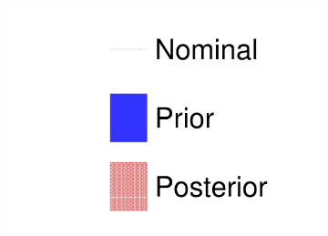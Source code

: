 \begin{figure}[h]
\begin{subfigure}[t]{0.32\textwidth}
	\end{subfigure}
	\begin{subfigure}[t]{0.32\textwidth}
		\includegraphics[width=\textwidth, trim={0mm 0mm 0mm 0mm}, clip, page=6]{figures/mach3/data/prior_error_1june_try_2017_fit_on_sk_spectra}
	\end{subfigure}
	

\end{figure}
